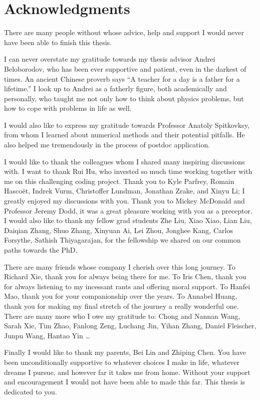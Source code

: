 \chapter*{Acknowledgments}
\label{chap:acknowledgments}

There are many people without whose advice, help and support I would never have
been able to finish this thesis.

I can never overstate my gratitude towards my thesis advisor Andrei Beloborodov,
who has been ever supportive and patient, even in the darkest of times. An
ancient Chinese proverb says ``A teacher for a day is a father for a lifetime.''
I look up to Andrei as a fatherly figure, both academically and personally, who
taught me not only how to think about physics problems, but how to cope with
problems in life as well.

I would also like to express my gratitude towards Professor Anatoly Spitkovksy,
from whom I learned about numerical methods and their potential pitfalls. He
also helped me tremendously in the process of postdoc application.

I would like to thank the colleagues whom I shared many inspiring discussions
with. I want to thank Rui Hu, who invested so much time working together with me
on this challenging coding project. Thank you to Kyle Parfrey, Romain Hascoët,
Indrek Vurm, Christoffer Lundman, Jonathan Zrake, and Xinyu Li; I greatly
enjoyed my discussions with you. Thank you to Mickey McDonald and Professor
Jeremy Dodd, it was a great pleasure working with you as a preceptor. I would
also like to thank my fellow grad students Zhe Liu, Xiao Xiao, Lian Liu, Daiqian
Zhang, Shuo Zhang, Xinyuan Ai, Lei Zhou, Jonghee Kang, Carlos Forsythe, Sathish
Thiyagarajan, for the fellowship we shared on our common paths towards the PhD.

There are many friends whose company I cherish over this long journey. To
Richard Xie, thank you for always being there for me. To Iris Chen, thank you
for always listening to my incessant rants and offering moral support. To Hanfei
Mao, thank you for your companionship over the years. To Annabel Huang, thank
you for making my final stretch of the journey a really wonderful one. There are
many more who I owe my gratitude to: Chong and Nannan Wang, Sarah Xie, Tim Zhao,
Fanlong Zeng, Luchang Jin, Yihan Zhang, Daniel Fleischer, Junpu Wang, Hantao Yin
\dots

Finally I would like to thank my parents, Bei Lin and Zhiping Chen. You have
been unconditionally supportive to whatever choices I make in life, whatever
dreams I pursue, and however far it takes me from home. Without your support and
encouragement I would not have been able to made this far. This thesis is
dedicated to you.

